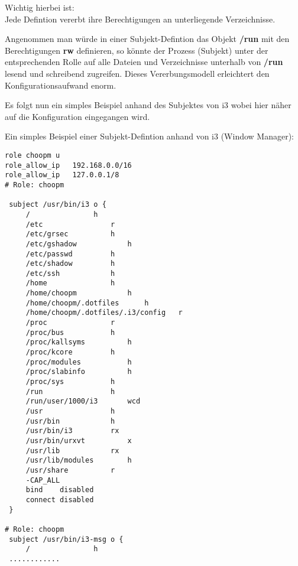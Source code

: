 Wichtig hierbei ist:\\
Jede Defintion vererbt ihre Berechtigungen an unterliegende Verzeichnisse.

Angenommen man würde in einer Subjekt-Defintion das Objekt \textbf{/run} mit den Berechtigungen \textbf{rw} definieren, so könnte der Prozess (Subjekt) unter der entsprechenden Rolle auf alle Dateien und Verzeichnisse unterhalb von \textbf{/run} lesend und schreibend zugreifen. Dieses Vererbungsmodell erleichtert den Konfigurationsaufwand enorm.

Es folgt nun ein simples Beispiel anhand des Subjektes von i3 wobei hier näher auf die Konfiguration eingegangen wird.

\newpage
Ein simples Beispiel einer Subjekt-Defintion anhand von i3 (Window Manager):
\begin{lstlisting}[numbers=none, frame=single, lineskip={-2.5pt}, breaklines=true]
role choopm u
role_allow_ip   192.168.0.0/16
role_allow_ip   127.0.0.1/8
# Role: choopm

 subject /usr/bin/i3 o {
     /               h
     /etc                r
     /etc/grsec          h
     /etc/gshadow            h
     /etc/passwd         h
     /etc/shadow         h
     /etc/ssh            h
     /home               h
     /home/choopm            h
     /home/choopm/.dotfiles      h
     /home/choopm/.dotfiles/.i3/config   r
     /proc               r
     /proc/bus           h
     /proc/kallsyms          h
     /proc/kcore         h
     /proc/modules           h
     /proc/slabinfo          h
     /proc/sys           h
     /run                h
     /run/user/1000/i3       wcd
     /usr                h
     /usr/bin            h
     /usr/bin/i3         rx
     /usr/bin/urxvt          x
     /usr/lib            rx
     /usr/lib/modules        h
     /usr/share          r
     -CAP_ALL
     bind    disabled
     connect disabled
 }
 
# Role: choopm
 subject /usr/bin/i3-msg o {
     /               h
 ............
\end{lstlisting}

